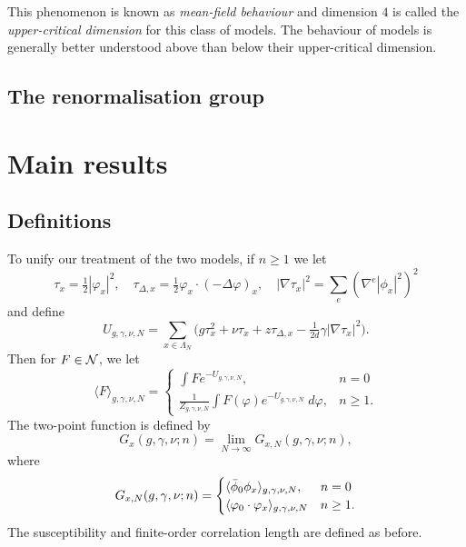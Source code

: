 This phenomenon is known as \emph{mean-field behaviour} and dimension $4$ is
called the \emph{upper-critical dimension} for this class of models. The behaviour
of models is generally better understood above than below their upper-critical
dimension.


\subsection{The renormalisation group}


\section{Main results}


\subsection{Definitions}

To unify our treatment of the two models, if $n \ge 1$ we let
\begin{equation}
\tau_x = \tfrac{1}{2} |\varphi_x|^2,
  \quad
\tau_{\Delta,x} = \tfrac{1}{2} \varphi_x \cdot (-\Delta \varphi)_x,
  \quad
|\nabla\tau_x|^2 = \sum_e (\nabla^e |\phi_x|^2)^2
\end{equation}
and define
\begin{equation}
U_{g,\gamma,\nu,N}
	=
\sum_{x\in\Lambda_N}
\Big(
	g \tau_x^2 + \nu \tau_x + z \tau_{\Delta,x} - \tfrac{1}{2 d} \gamma |\nabla\tau_x|^2
\Big).
\end{equation}
Then for $F \in \mathcal{N}$, we let
\begin{equation}
\langle F \rangle_{g,\gamma,\nu,N}
	=
\begin{cases}
\int F e^{-U_{g,\gamma,\nu,N}},								& n = 0 \\
\frac{1}{Z_{g,\gamma,\nu,N}}
	\int F(\varphi) e^{-U_{g,\gamma,\nu,N}} \; d\varphi,	& n \ge 1.
\end{cases}
\end{equation}
The two-point function is defined by
\begin{equation}
G_x(g, \gamma, \nu; n) = \lim_{N\to\infty} G_{x,N}(g, \gamma, \nu; n),
\end{equation}
where
\begin{equation}
G_{x,N}(g, \gamma, \nu; n)
	=
\begin{cases}
\langle \bar\phi_0 \phi_x \rangle_{g,\gamma,\nu,N},			& n = 0 \\
\langle \varphi_0 \cdot \varphi_x \rangle_{g,\gamma,\nu,N}	& n \ge 1.
\end{cases}
\end{equation}
The susceptibility and finite-order correlation length are defined as before.


